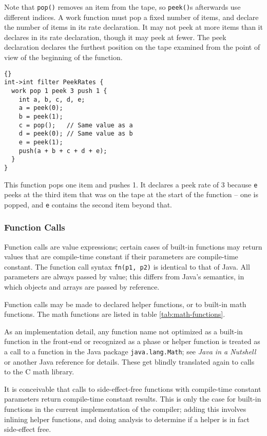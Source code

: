 \documentclass[11pt]{article}
\begin{document}
Note that \lstinline|pop()| removes an item from the tape, so
\lstinline|peek()|s afterwards use different indices.  A work function
must pop a fixed number of items, and declare the number of items in
its rate declaration.  It may not peek at more items than it declares
in its rate declaration, though it may peek at fewer.  The peek
declaration declares the furthest position on the tape examined from
the point of view of the beginning of the function.

\begin{lstlisting}{}
int->int filter PeekRates {
  work pop 1 peek 3 push 1 {
    int a, b, c, d, e;
    a = peek(0);
    b = peek(1);
    c = pop();   // Same value as a
    d = peek(0); // Same value as b
    e = peek(1);
    push(a + b + c + d + e);
  }
}
\end{lstlisting}

This function pops one item and pushes 1.  It declares a peek rate of
3 because \lstinline|e| peeks at the third item that was on the tape
at the start of the function -- one is popped, and \lstinline|e|
contains the second item beyond that.

\subsubsection{Function Calls}
\label{sec:expr-funcall}

Function calls are value expressions; certain cases of built-in
functions may return values that are compile-time constant if their
parameters are compile-time constant.  The function call syntax
\lstinline|fn(p1, p2)| is identical to that of Java.  All parameters are
always passed by value; this differs from Java's semantics, in which
objects and arrays are passed by reference.

Function calls may be made to declared helper functions, or to
built-in math functions.  The math functions are listed in table
\ref{tab:math-functions}.

\begin{note}
  As an implementation detail, any function name not optimized as a
  built-in function in the front-end or recognized as a phase or
  helper function is treated as a call to a function in the Java
  package \lstinline|java.lang.Math|; see \emph{Java in a Nutshell} or
  another Java reference for details.  These get blindly translated
  again to calls to the C math library.
\end{note}

\begin{note}
  It is conceivable that calls to side-effect-free functions with
  compile-time constant parameters return compile-time constant
  results.  This is only the case for built-in functions in the
  current implementation of the compiler; adding this involves
  inlining helper functions, and doing analysis to determine if a
  helper is in fact side-effect free.
\end{note}
\end{document}
